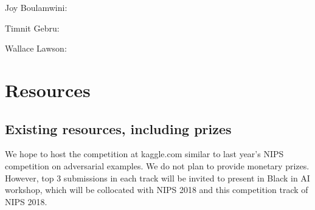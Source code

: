 \documentclass[11pt, oneside]{article}
\begin{document}
{Joy Boulamwini}: 

{Timnit Gebru}:

{Wallace Lawson}:



\section{Resources}
\subsection{Existing resources, including prizes}

We hope to host the competition at kaggle.com similar to last year's NIPS competition on adversarial examples. We do not plan to provide monetary prizes. However, top 3 submissions in each track will be invited to present in Black in AI workshop, which will be collocated with NIPS 2018 and this competition track of NIPS 2018.



%

\end{document}
